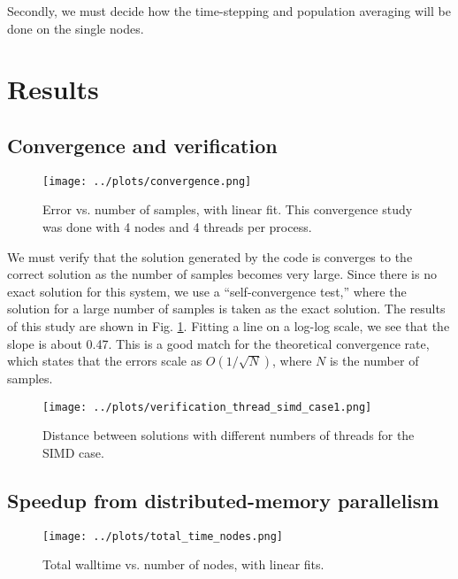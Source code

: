 \documentclass{article}
\begin{document}
Secondly, we must decide how the time-stepping and population averaging will be done on the single nodes. 

\section{Results} \label{results}

\subsection{Convergence and verification}

\begin{figure}
    \centering
    \texttt{[image: ../plots/convergence.png]}
    \caption{Error vs. number of samples, with linear fit. This convergence study was done with 
    4 nodes and 4 threads per process.}
    \label{fig:convergence}
\end{figure}

We must verify that the solution generated by the code is converges to the correct solution as the number of samples 
becomes very large. Since there is no exact solution for this system, we use a ``self-convergence test,'' where the solution 
for a large number of samples is taken as the exact solution. The results of this study are shown in Fig. \ref{fig:convergence}.
Fitting a line on a log-log scale, we see that the slope is about 0.47. This is a good match for the theoretical 
convergence rate, which states that the errors scale as \(O(1/\sqrt{N})\), where \(N\) is the number of samples. 

\begin{figure}
    \centering
    \texttt{[image: ../plots/verification\_thread\_simd\_case1.png]}
    \caption{Distance between solutions with different numbers of threads for the SIMD case.}
    \label{fig:verification-thread-simd-case1}
\end{figure}

\subsection{Speedup from distributed-memory parallelism}

\begin{figure}
    \centering
    \texttt{[image: ../plots/total\_time\_nodes.png]}
    \caption{Total walltime vs. number of nodes, with linear fits.}
    \label{fig:node-total-walltime}
\end{figure}
\end{document}
